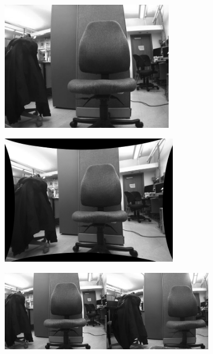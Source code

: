\begin{figure}
\centering
\begin{subfigure}{0.49\textwidth}
\includegraphics[width=\linewidth, height=5.5cm]{pictures/mono-distorted}
\end{subfigure}
\begin{subfigure}{0.49\textwidth}
\includegraphics[width=\linewidth, height=5.5cm]{pictures/mono-undistorted}
\end{subfigure}
\caption{Image undistortion on a mono calibrated camera image. The pincushion will be centered in the real main focal point.  (source: \href{http://paulbourke.net/stereographics/stereorender/}{paulbourke.net})}
\label{fig:mono_undistort}
\vspace*{0.4cm}
\begin{subfigure}{0.49\textwidth}
\includegraphics[width=\linewidth]{pictures/stereo-distorted}

\end{subfigure}
\end{figure}
